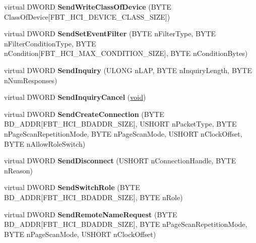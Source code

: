 \begin{DoxyCompactItemize}
virtual D\+W\+O\+RD {\bfseries Send\+Write\+Class\+Of\+Device} (B\+Y\+TE Class\+Of\+Device\mbox{[}F\+B\+T\+\_\+\+H\+C\+I\+\_\+\+D\+E\+V\+I\+C\+E\+\_\+\+C\+L\+A\+S\+S\+\_\+\+S\+I\+ZE\mbox{]})
\item 
\mbox{\label{class_c_hci_local_a63acfa45945667090f18ad9086a22451}} 
virtual D\+W\+O\+RD {\bfseries Send\+Set\+Event\+Filter} (B\+Y\+TE n\+Filter\+Type, B\+Y\+TE n\+Filter\+Condition\+Type, B\+Y\+TE n\+Condition\mbox{[}F\+B\+T\+\_\+\+H\+C\+I\+\_\+\+M\+A\+X\+\_\+\+C\+O\+N\+D\+I\+T\+I\+O\+N\+\_\+\+S\+I\+ZE\mbox{]}, B\+Y\+TE n\+Condition\+Bytes)
\item 
\mbox{\label{class_c_hci_local_ac1d9c3abe09ce94e9ac6ab814345fa1c}} 
virtual D\+W\+O\+RD {\bfseries Send\+Inquiry} (U\+L\+O\+NG n\+L\+AP, B\+Y\+TE n\+Inquiry\+Length, B\+Y\+TE n\+Num\+Responses)
\item 
\mbox{\label{class_c_hci_local_a040efb7187c6fe1ebbb7cbfe4ef56733}} 
virtual D\+W\+O\+RD {\bfseries Send\+Inquiry\+Cancel} (\hyperlink{interfacevoid}{void})
\item 
\mbox{\label{class_c_hci_local_a84388102db96cfdc197f77ea183ded7d}} 
virtual D\+W\+O\+RD {\bfseries Send\+Create\+Connection} (B\+Y\+TE B\+D\+\_\+\+A\+D\+DR\mbox{[}F\+B\+T\+\_\+\+H\+C\+I\+\_\+\+B\+D\+A\+D\+D\+R\+\_\+\+S\+I\+ZE\mbox{]}, U\+S\+H\+O\+RT n\+Packet\+Type, B\+Y\+TE n\+Page\+Scan\+Repetition\+Mode, B\+Y\+TE n\+Page\+Scan\+Mode, U\+S\+H\+O\+RT n\+Clock\+Offset, B\+Y\+TE n\+Allow\+Role\+Switch)
\item 
\mbox{\label{class_c_hci_local_a475a21e9c14a8ea5f64b75359f55e9b8}} 
virtual D\+W\+O\+RD {\bfseries Send\+Disconnect} (U\+S\+H\+O\+RT n\+Connection\+Handle, B\+Y\+TE n\+Reason)
\item 
\mbox{\label{class_c_hci_local_a6c72e5ca4101c0b070c094923cfe36ab}} 
virtual D\+W\+O\+RD {\bfseries Send\+Switch\+Role} (B\+Y\+TE B\+D\+\_\+\+A\+D\+DR\mbox{[}F\+B\+T\+\_\+\+H\+C\+I\+\_\+\+B\+D\+A\+D\+D\+R\+\_\+\+S\+I\+ZE\mbox{]}, B\+Y\+TE n\+Role)
\item 
\mbox{\label{class_c_hci_local_a571ef45229005d5fa9c3355c340d7431}} 
virtual D\+W\+O\+RD {\bfseries Send\+Remote\+Name\+Request} (B\+Y\+TE B\+D\+\_\+\+A\+D\+DR\mbox{[}F\+B\+T\+\_\+\+H\+C\+I\+\_\+\+B\+D\+A\+D\+D\+R\+\_\+\+S\+I\+ZE\mbox{]}, B\+Y\+TE n\+Page\+Scan\+Repetition\+Mode, B\+Y\+TE n\+Page\+Scan\+Mode, U\+S\+H\+O\+RT n\+Clock\+Offset)

\end{DoxyCompactItemize}
